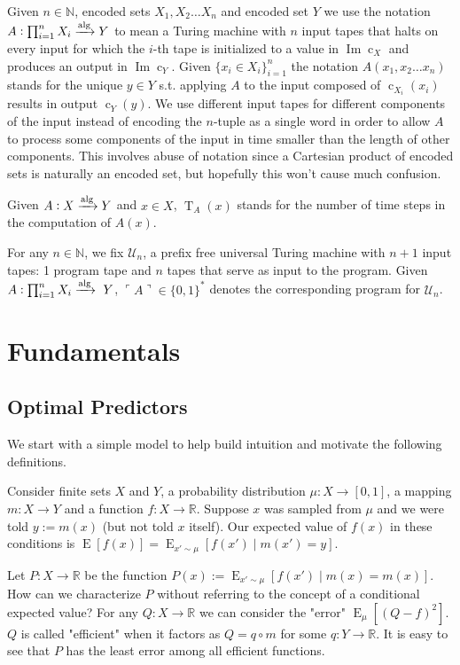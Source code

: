 \documentclass{article}
\numberwithin{equation}{section}
\theoremstyle{definition}
\theoremstyle{plain}
\newcommand{\Words}{{\{ 0, 1 \}^*}}
\DeclareMathOperator{\Img}{Im}
\DeclareMathOperator{\E}{E}
\DeclareMathOperator{\T}{T}
\DeclareMathOperator{\En}{c}
\newcommand{\Nats}{\mathbb{N}}
\newcommand{\Reals}{\mathbb{R}}
\newcommand{\Quote}[1]{\ulcorner #1 \urcorner}
\newcommand{\Alg}{\xrightarrow{\textnormal{alg}}}
\begin{document}
Given $n \in \Nats$, encoded sets $X_1, X_2 \ldots X_n$ and encoded set $Y$ we use the notation $A: \prod_{i=1}^n X_i \Alg Y$ to mean a Turing machine with $n$ input tapes that halts on every input for which the $i$-th tape is initialized to a value in $\Img \En_X$ and produces an output in $\Img \En_Y$. Given $\{x_i \in X_i\}_{i=1}^n$ the notation $A(x_1, x_2 \ldots x_n)$ stands for the unique $y \in Y$ s.t. applying $A$ to the input composed of $\En_{X_i}(x_i)$ results in output $\En_Y(y)$. We use different input tapes for different components of the input instead of encoding the $n$-tuple as a single word in order to allow $A$ to process some components of the input in time smaller than the length of other components. This involves abuse of notation since a Cartesian product of encoded sets is naturally an encoded set, but hopefully this won't cause much confusion.

Given $A: X \Alg Y$ and $x \in X$, $\T_A(x)$ stands for the number of time steps in the computation of $A(x)$.

For any $n \in \Nats$, we fix $\mathcal{U}_n$, a prefix free universal Turing machine with $n+1$ input tapes: 1 program tape and $n$ tapes that serve as input to the program. Given $A: \prod_{i=1}^n X_i \Alg\ Y$, $\Quote{A} \in \Words$ denotes the corresponding program for $\mathcal{U}_n$.

\section{Fundamentals}
\label{sec:fundamentals}

\subsection{Optimal Predictors}

We start with a simple model to help build intuition and motivate the following definitions.

Consider finite sets $X$ and $Y$, a probability distribution $\mu: X \rightarrow [0,1]$, a mapping $m: X \rightarrow Y$ and a function $f: X \rightarrow \Reals$. Suppose $x$ was sampled from $\mu$ and we were told $y := m(x)$ (but not told $x$ itself). Our expected value of $f(x)$ in these conditions is $\E[f(x)] = \E_{x' \sim \mu}[f(x') \mid m(x') = y]$.

Let $P: X \rightarrow \Reals$ be the function $P(x) := \E_{x' \sim \mu}[f(x') \mid m(x) = m(x)]$. How can we characterize $P$ without referring to the concept of a conditional expected value? For any $Q: X \rightarrow \Reals$ we can consider the "error" $\E_\mu[(Q - f)^2]$. $Q$ is called "efficient" when it factors as $Q = q \circ m$ for some $q: Y \rightarrow \Reals$. It is easy to see that $P$ has the least error among all efficient functions.
\end{document}
